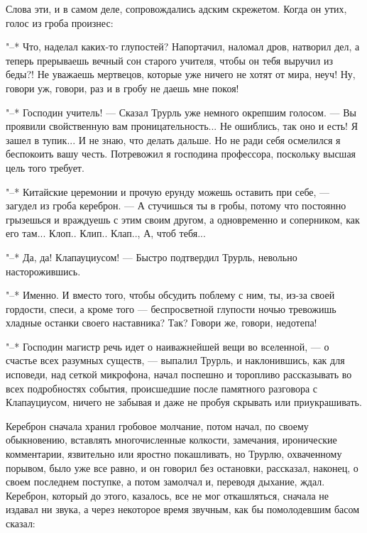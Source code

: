 Слова эти, и в самом деле, сопровождались адским
скрежетом. Когда он утих, голос из гроба произнес:

"--* Что, наделал каких-то глупостей? Напортачил, наломал
дров, натворил дел, а теперь прерываешь вечный сон старого
учителя, чтобы он тебя выручил из беды?! Не уважаешь
мертвецов, которые уже ничего не хотят от мира, неуч! Ну,
говори уж, говори, раз и в гробу не даешь мне покоя!

"--* Господин учитель! --- Сказал Трурль уже немного
окрепшим голосом. --- Вы проявили свойственную вам
проницательность... Не ошиблись, так оно и есть! Я зашел в
тупик... И не знаю, что делать дальше. Но не ради себя
осмелился я беспокоить вашу честь. Потревожил я господина
профессора, поскольку высшая цель того требует.

"--* Китайские церемонии и прочую ерунду можешь оставить
при себе, --- загудел из гроба кереброн. --- А стучишься ты в
гробы, потому что постоянно грызешься и враждуешь с этим
своим другом, а одновременно и соперником, как его там...
Клоп.. Клип.. Клап.., А, чтоб тебя...

"--* Да, да! Клапауциусом! --- Быстро подтвердил
Трурль, невольно насторожившись.

"--* Именно. И вместо того, чтобы обсудить поблему с ним,
ты, из-за своей гордости, спеси, а кроме того --- беспросветной
глупости ночью тревожишь хладные останки
своего наставника? Так? Говори же, говори, недотепа!

"--* Господин магистр речь идет о наиважнейшей вещи во
вселенной, --- о счастье всех разумных существ, --- выпалил
Трурль, и наклонившись, как для исповеди, над сеткой
микрофона, начал поспешно и торопливо рассказывать во всех
подробностях события, происшедшие после памятного разговора
с Клапауциусом, ничего не забывая и даже не пробуя скрывать
или приукрашивать.

Кереброн сначала хранил гробовое молчание, потом начал,
по своему обыкновению, вставлять многочисленные колкости,
замечания, иронические комментарии, язвительно или яростно
покашливать, но Трурлю, охваченному порывом, было уже все
равно, и он говорил без остановки, рассказал, наконец, о
своем последнем поступке, а потом замолчал и, переводя
дыхание, ждал. Кереброн, который до этого, казалось, все не
мог откашляться, сначала не издавал ни звука, а через
некоторое время звучным, как бы помолодевшим басом сказал:

